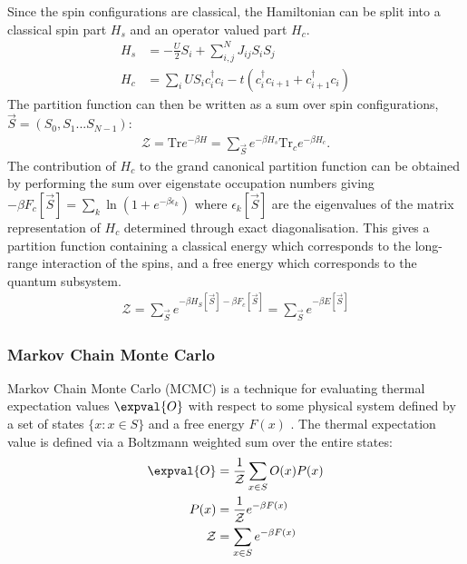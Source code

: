 Since the spin configurations are classical, the Hamiltonian can be split into a classical spin part \(H_s\) and an operator valued part \(H_c\). \[\begin{aligned}
H_s& = - \frac{U}{2}S_i + \sum_{i, j}^{N} J_{ij} S_i S_j \\
H_c& = \sum_i U S_i c^\dagger_{i}c_{i} -t(c^\dagger_{i}c_{i+1} + c^\dagger_{i+1}c_{i}) 
\end{aligned}\] The partition function can then be written as a sum over spin configurations, \(\vec{S} = (S_0, S_1...S_{N-1})\): \[\begin{aligned}
\mathcal{Z} = \mathrm{Tr} e^{-\beta H}= \sum_{\vec{S}} e^{-\beta H_s} \mathrm{Tr}_c e^{-\beta H_c} .
\end{aligned}
\] The contribution of \(H_c\) to the grand canonical partition function can be obtained by performing the sum over eigenstate occupation numbers giving \(-\beta F_c[\vec{S}] = \sum_k \ln{(1 + e^{- \beta \epsilon_k})}\) where \({\epsilon_k[\vec{S}]}\) are the eigenvalues of the matrix representation of \(H_c\) determined through exact diagonalisation. This gives a partition function containing a classical energy which corresponds to the long-range interaction of the spins, and a free energy which corresponds to the quantum subsystem. \[\begin{aligned}
\mathcal{Z} = \sum_{\vec{S}} e^{-\beta H_S[\vec{S}] - \beta F_c[\vec{S}]} = \sum_{\vec{S}} e^{-\beta E[\vec{S}]}
\end{aligned}\]

\hypertarget{markov-chain-monte-carlo-1}{%
\subsubsection{Markov Chain Monte Carlo}\label{markov-chain-monte-carlo-1}}

Markov Chain Monte Carlo (MCMC) is a technique for evaluating thermal expectation values \(\expval{O}\) with respect to some physical system defined by a set of states \(\{x: x \in S\}\) and a free energy \(F(x)\) \autocite{krauthIntroductionMonteCarlo1998}. The thermal expectation value is defined via a Boltzmann weighted sum over the entire states: \[
\begin{aligned}
    \expval{O} &= \frac{1}{\mathcal{Z}} \sum_{x \in S} O(x) P(x) \\
    P(x) &= \frac{1}{\mathcal{Z}} e^{-\beta F(x)} \\
    \mathcal{Z} &= \sum_{x \in S} e^{-\beta F(x)}
\end{aligned}
\]

